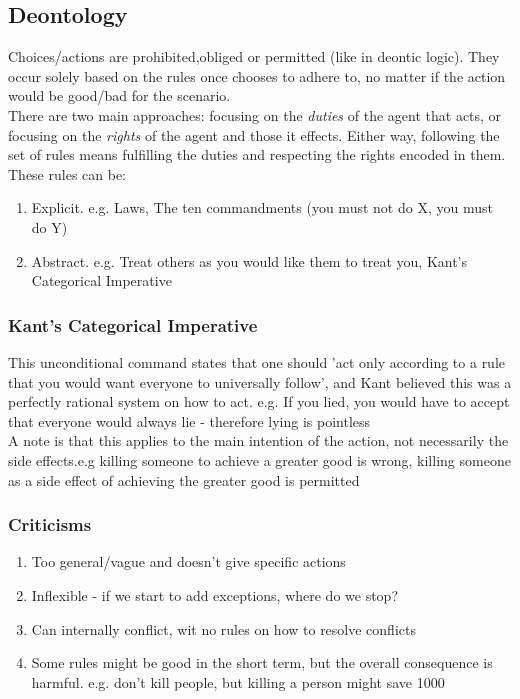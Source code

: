 \subsection{Deontology}
Choices/actions are prohibited,obliged or permitted (like in deontic logic). They occur solely based on the rules once chooses to adhere to, no matter if the action would be good/bad for the scenario. \\

There are two main approaches: focusing on the \emph{duties} of the agent that acts, or focusing on the \emph{rights} of the agent and those it effects. Either way, following the set of rules means fulfilling the duties and respecting the rights encoded in them. \\

These rules can be: 
\begin{enumerate}
    \item Explicit. e.g. Laws, The ten commandments (you must not do X, you must do Y)
    \item Abstract. e.g. Treat others as you would like them to treat you, Kant's Categorical Imperative
\end{enumerate}

\subsubsection{Kant's Categorical Imperative}
This unconditional command states that one should 'act only according to a rule that you would want everyone to universally follow', and Kant believed this was a perfectly rational system on how to act. e.g. If you lied, you would have to accept that everyone would always lie - therefore lying is pointless\\

A note is that this applies to the main intention of the action, not necessarily the side effects.e.g killing someone to achieve a greater good is wrong, killing someone as a side effect of achieving the greater good is permitted

\subsubsection{Criticisms}
\begin{enumerate}
    \item Too general/vague and doesn't give specific actions
    \item Inflexible - if we start to add exceptions, where do we stop?
    \item Can internally conflict, wit no rules on how to resolve conflicts
    \item Some rules might be good in the short term, but the overall consequence is harmful. e.g. don't kill people, but killing a person might save 1000
\end{enumerate}


